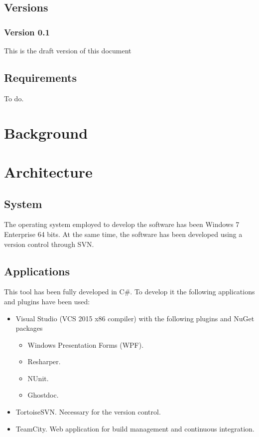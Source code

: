 \documentclass[signature]{deltares_manual}
\begin{document}
\section{Versions}
\label{sec:Versions}

\subsection{Version 0.1}
\label{sec:Version}
This is the draft version of this document

\section{Requirements}
\label{sec:requirements}
To do.


\chapter{Background} 
\label{chapterBackground}


\chapter{Architecture} 
\label{chapterArchitecture}

\section{System}
\label{sec:system}
The operating system employed to develop the software has been Windows 7 Enterprise 64 bits. 
At the same time, the software has been developed using a version control through SVN.


\section{Applications}
\label{sec:application}
This tool has been fully developed in C\#. To develop it the following applications and plugins have been used:
\begin{itemize}
	\item Visual Studio (VCS 2015 x86 compiler) with the following plugins and NuGet packages
		\begin{itemize}
			\item Windows Presentation Forms (WPF).
			\item Resharper.
			\item NUnit.
			\item Ghostdoc.
		\end{itemize}
	\item TortoiseSVN. Necessary for the version control.
	\item TeamCity. Web application for build management and continuous integration.
\end{itemize}
\end{document}

